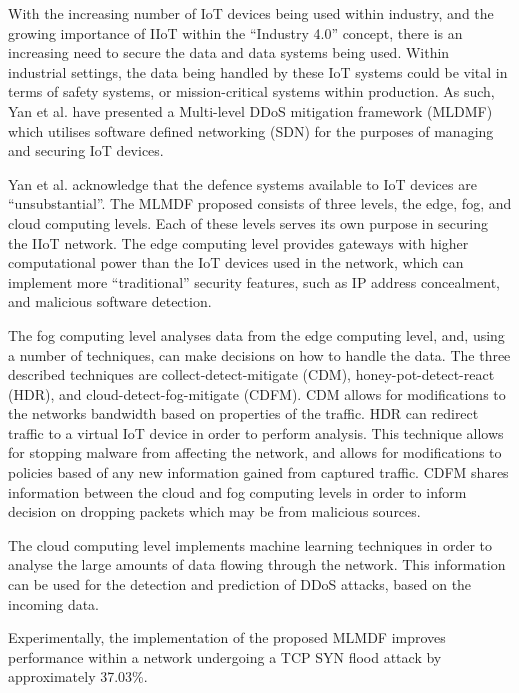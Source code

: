 With the increasing number of IoT devices being used within industry, and the
growing importance of IIoT within the ``Industry 4.0'' concept, there is an
increasing need to secure the data and data systems being used. Within
industrial settings, the data being handled by these IoT systems could be vital
in terms of safety systems, or mission-critical systems within production. As
such, Yan et al. have presented a Multi-level DDoS mitigation
framework (MLDMF) which utilises software defined networking (SDN) for the
purposes of managing and securing IoT devices\cite{iiot_2019}.

Yan et al. acknowledge that the defence systems available to IoT devices are
``unsubstantial''. The MLMDF proposed consists of three levels, the edge, fog,
and cloud computing levels. Each of these levels serves its own purpose in
securing the IIoT network. The edge computing level provides gateways with
higher computational power than the IoT devices used in the network, which can
implement more ``traditional'' security features, such as IP address
concealment, and malicious software detection.

The fog computing level analyses data from the edge computing level, and, using
a number of techniques, can make decisions on how to handle the data. The three
described techniques are collect-detect-mitigate (CDM), honey-pot-detect-react
(HDR), and cloud-detect-fog-mitigate (CDFM). CDM allows for modifications to the
networks bandwidth based on properties of the traffic. HDR can redirect traffic
to a virtual IoT device in order to perform analysis. This technique allows for
stopping malware from affecting the network, and allows for modifications to
policies based of any new information gained from captured traffic. CDFM shares
information between the cloud and fog computing levels in order to inform
decision on dropping packets which may be from malicious sources.

The cloud computing level implements machine learning techniques in order to
analyse the large amounts of data flowing through the network. This information
can be used for the detection and prediction of DDoS attacks, based on the
incoming data.

Experimentally, the implementation of the proposed MLMDF improves performance
within a network undergoing a TCP SYN flood attack by approximately 37.03\%.
